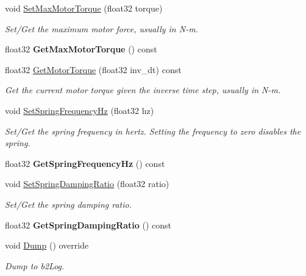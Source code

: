 \begin{DoxyCompactItemize}
void \hyperlink{classb2WheelJoint_a8aae3cd624ec9d48fc86c325c4595edc}{Set\+Max\+Motor\+Torque} (float32 torque)
\begin{DoxyCompactList}\small\item\em Set/\+Get the maximum motor force, usually in N-\/m. \end{DoxyCompactList}\item 
\mbox{\label{classb2WheelJoint_a8e7dc36e5c59760f2807886d0acd514e}} 
float32 {\bfseries Get\+Max\+Motor\+Torque} () const
\item 
\mbox{\label{classb2WheelJoint_a635497eba904925e06fd5316ddec4539}} 
float32 \hyperlink{classb2WheelJoint_a635497eba904925e06fd5316ddec4539}{Get\+Motor\+Torque} (float32 inv\+\_\+dt) const
\begin{DoxyCompactList}\small\item\em Get the current motor torque given the inverse time step, usually in N-\/m. \end{DoxyCompactList}\item 
\mbox{\label{classb2WheelJoint_af9f8fada5cb30f83aa2fbf486e9d347b}} 
void \hyperlink{classb2WheelJoint_af9f8fada5cb30f83aa2fbf486e9d347b}{Set\+Spring\+Frequency\+Hz} (float32 hz)
\begin{DoxyCompactList}\small\item\em Set/\+Get the spring frequency in hertz. Setting the frequency to zero disables the spring. \end{DoxyCompactList}\item 
\mbox{\label{classb2WheelJoint_a3a22add79f238b4243407956b031c9f4}} 
float32 {\bfseries Get\+Spring\+Frequency\+Hz} () const
\item 
\mbox{\label{classb2WheelJoint_a39b123ac045c8ec93faa65746e6655dc}} 
void \hyperlink{classb2WheelJoint_a39b123ac045c8ec93faa65746e6655dc}{Set\+Spring\+Damping\+Ratio} (float32 ratio)
\begin{DoxyCompactList}\small\item\em Set/\+Get the spring damping ratio. \end{DoxyCompactList}\item 
\mbox{\label{classb2WheelJoint_a18726ad5af314531f518132d6623bc61}} 
float32 {\bfseries Get\+Spring\+Damping\+Ratio} () const
\item 
\mbox{\label{classb2WheelJoint_a8295644bd733c28c8c9fa6390a367f3f}} 
void \hyperlink{classb2WheelJoint_a8295644bd733c28c8c9fa6390a367f3f}{Dump} () override
\begin{DoxyCompactList}\small\item\em Dump to b2\+Log. \end{DoxyCompactList}\end{DoxyCompactItemize}
